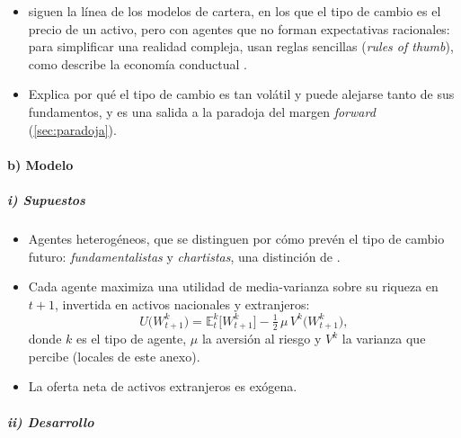 \documentclass[11pt]{article}
\begin{document}
\begin{itemize}
\item \textcite{DeGrauweGrimaldi2006} siguen la línea de los modelos de cartera, en los que el tipo de cambio es el precio de un activo, pero con agentes que no forman expectativas racionales: para simplificar una realidad compleja, usan reglas sencillas (\emph{rules of thumb}), como describe la economía conductual  .
\item Explica por qué el tipo de cambio es tan volátil y puede alejarse tanto de sus fundamentos, y es una salida a la paradoja del margen \emph{forward} (\ref{sec:paradoja}).
\end{itemize}

\paragraph{b) Modelo}

\subparagraph{i) Supuestos}

\begin{itemize}
\item Agentes heterogéneos, que se distinguen por cómo prevén el tipo de cambio futuro: \emph{fundamentalistas} y \emph{chartistas}, una distinción de \textcite{FrankelFroot1990Chartists}.
\item Cada agente maximiza una utilidad de media-varianza sobre su riqueza en $t+1$, invertida en activos nacionales y extranjeros:
  \begin{equation}\label{eq:dgg-utilidad}
  U\big(W^{k}_{t+1}\big)=\mathbb{E}^{k}_t\big[W^{k}_{t+1}\big]-\tfrac{1}{2}\,\mu\,V^{k}\big(W^{k}_{t+1}\big),
  \end{equation}
  donde $k$ es el tipo de agente, $\mu$ la aversión al riesgo y $V^k$ la varianza que percibe (locales de este anexo).
\item La oferta neta de activos extranjeros es exógena.
\end{itemize}

\subparagraph{ii) Desarrollo}
\end{document}
